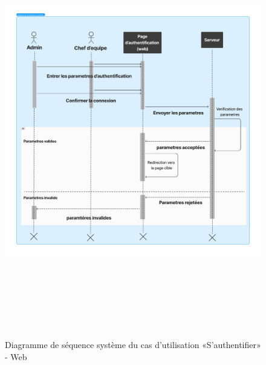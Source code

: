 \begin{figure}[ht!]
  \centering
  \includegraphics[width=1\textwidth,height=18cm]{chap3.images/1.png}
  \caption{Diagramme de séquence système du cas d’utilisation «S’authentifier» - Web}

\end{figure}
\newpage
